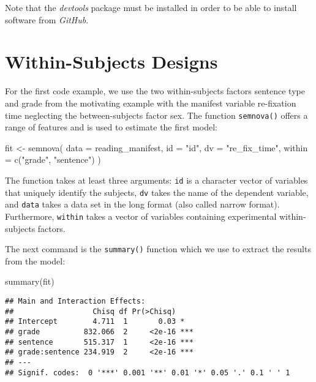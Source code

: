 \documentclass[
]{book}
\newenvironment{Shaded}{\begin{snugshade}}{\end{snugshade}}
\newcommand{\AttributeTok}[1]{\textcolor[rgb]{0.77,0.63,0.00}{#1}}
\newcommand{\FunctionTok}[1]{\textcolor[rgb]{0.00,0.00,0.00}{#1}}
\newcommand{\NormalTok}[1]{#1}
\newcommand{\OtherTok}[1]{\textcolor[rgb]{0.56,0.35,0.01}{#1}}
\newcommand{\StringTok}[1]{\textcolor[rgb]{0.31,0.60,0.02}{#1}}
\begin{document}
Note that the \emph{devtools} package must be installed in order to be able to install software from \emph{GitHub}.

\hypertarget{within-subjects-designs}{%
\chapter{Within-Subjects Designs}\label{within-subjects-designs}}

For the first code example, we use the two within-subjects factors sentence type and grade from the motivating example with the manifest variable re-fixation time neglecting the between-subjects factor sex. The function \texttt{semnova()} offers a range of features and is used to estimate the first model:

\begin{Shaded}
\begin{Highlighting}[]
\NormalTok{fit }\OtherTok{\textless{}{-}} \FunctionTok{semnova}\NormalTok{(}
    \AttributeTok{data =}\NormalTok{ reading\_manifest,}
    \AttributeTok{id =} \StringTok{"id"}\NormalTok{, }
    \AttributeTok{dv =} \StringTok{"re\_fix\_time"}\NormalTok{,}
    \AttributeTok{within =} \FunctionTok{c}\NormalTok{(}\StringTok{"grade"}\NormalTok{, }\StringTok{"sentence"}\NormalTok{)}
\NormalTok{)}
\end{Highlighting}
\end{Shaded}

The function takes at least three arguments: \texttt{id} is a character vector of variables that uniquely identify the subjects, \texttt{dv} takes the name of the dependent variable, and \texttt{data} takes a data set in the long format (also called narrow format). Furthermore, \texttt{within} takes a vector of variables containing experimental within-subjects factors.

The next command is the \texttt{summary()} function which we use to extract the results from the model:

\begin{Shaded}
\begin{Highlighting}[]
\FunctionTok{summary}\NormalTok{(fit)}
\end{Highlighting}
\end{Shaded}

\begin{verbatim}
## Main and Interaction Effects:
##                  Chisq df Pr(>Chisq)    
## Intercept        4.711  1       0.03 *  
## grade          832.066  2     <2e-16 ***
## sentence       515.317  1     <2e-16 ***
## grade:sentence 234.919  2     <2e-16 ***
## ---
## Signif. codes:  0 '***' 0.001 '**' 0.01 '*' 0.05 '.' 0.1 ' ' 1
\end{verbatim}
\end{document}
